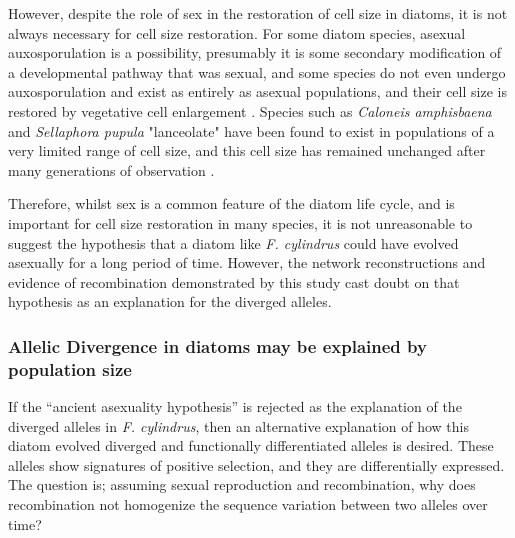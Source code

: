 However, despite the role of sex in the restoration of cell size in diatoms, it is not always necessary for cell size restoration.
For some diatom species, asexual auxosporulation is a possibility, presumably it is some secondary modification of a developmental pathway that was sexual, and some species do not even undergo auxosporulation and exist as entirely as asexual populations, and their cell size is restored by vegetative cell enlargement \parencite{Chepurnov2004,Gallagher1983,Nagai1995,Sabbe2004,werner1977biology}.
Species such as \textit{Caloneis amphisbaena} and \textit{Sellaphora pupula} "lanceolate" have been found to exist in populations of a very limited range of cell size, and this cell size has remained unchanged after many generations of observation \parencite{Mann1989,Mann2004}.

Therefore, whilst sex is a common feature of the diatom life cycle, and is important for cell size restoration in many species, it is not unreasonable to suggest the hypothesis that a diatom like \textit{F. cylindrus} could have evolved asexually for a long period of time.
However, the network reconstructions and evidence of recombination demonstrated by this study cast doubt on that hypothesis as an explanation for the diverged alleles.


\subsubsection{Allelic Divergence in diatoms may be explained by population size}

If the “ancient asexuality hypothesis” is rejected as the explanation of the diverged alleles in \textit{F. cylindrus}, then an alternative explanation of how this diatom evolved diverged and functionally differentiated alleles is desired.
These alleles show signatures of positive selection, and they are differentially expressed.
The question is; assuming sexual reproduction and recombination, why does recombination not homogenize the sequence variation between two alleles over time? 

